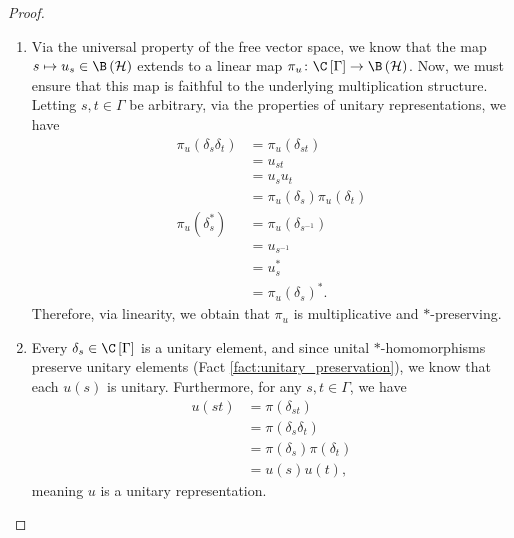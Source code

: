 \begin{proof}\hfill
  \begin{enumerate}[(1)]
    \item Via the universal property of the free vector space, we know that the map $s\mapsto u_s\in \B\left( \mathcal{H} \right)$ extends to a linear map $\pi_u\colon \C\left[ \Gamma \right]\rightarrow \B\left( \mathcal{H} \right)$. Now, we must ensure that this map is faithful to the underlying multiplication structure. Letting $s,t\in \Gamma$ be arbitrary, via the properties of unitary representations, we have
      \begin{align*}
        \pi_u\left( \delta_s\delta_t \right) &= \pi_u\left( \delta_{st} \right)\\
                                             &= u_{st}\\
                                             &= u_su_t\\
                                             &= \pi_u\left( \delta_s \right)\pi_u\left( \delta_t \right)\\
        \pi_u\left( \delta_{s}^{\ast} \right) &= \pi_u\left( \delta_{s^{-1}} \right)\\
                                              &= u_{s^{-1}}\\
                                              &= u_s^{\ast}\\
                                              &= \pi_u\left( \delta_s \right)^{\ast}.
      \end{align*}
      Therefore, via linearity, we obtain that $\pi_u$ is multiplicative and $\ast$-preserving.
    \item Every $\delta_s\in \C\left[ \Gamma \right]$ is a unitary element, and since unital $\ast$-homomorphisms preserve unitary elements (Fact \ref{fact:unitary_preservation}), we know that each $u(s)$ is unitary. Furthermore, for any $s,t\in\Gamma$, we have
      \begin{align*}
        u\left( st \right) &= \pi\left( \delta_{st} \right)\\
                           &= \pi\left( \delta_s\delta_t \right)\\
                           &= \pi\left( \delta_s \right)\pi\left( \delta_t \right)\\
                           &= u(s)u(t),
      \end{align*}
      meaning $u$ is a unitary representation.
  \end{enumerate}
\end{proof}

